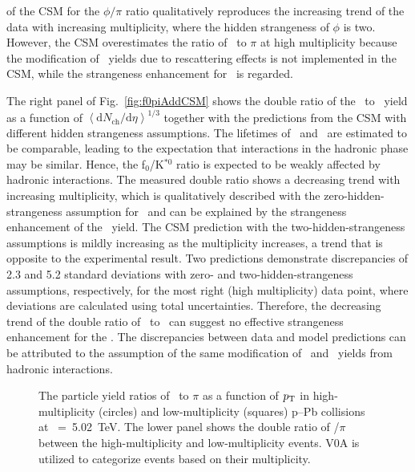 of the CSM for the $\phi/\pi$ ratio qualitatively reproduces the increasing trend of the data with increasing multiplicity, where the hidden strangeness of $\phi$ is two. However, the CSM overestimates the ratio of \kstar~to $\pi$ at high multiplicity because the modification of \kstar~yields due to rescattering effects is not implemented in the CSM, while the strangeness enhancement for \kstar~is regarded.

The right panel of Fig.~\ref{fig:f0piAddCSM} shows the double ratio of the \fzero~to \kstar~yield as a function of $\left\langle \mathrm{d}N_{\mathrm{ch}}/\mathrm{d}\eta \right\rangle^{1/3}$ together with the predictions from the CSM with different hidden strangeness assumptions. The lifetimes of \fzero~and \kstar~are estimated to be comparable, leading to the expectation that interactions in the hadronic phase may be similar. Hence, the f$_{0}$/K$^{*0}$ ratio is expected to be weakly affected by hadronic interactions. The measured double ratio shows a decreasing trend with increasing multiplicity, which is qualitatively described with the zero-hidden-strangeness assumption for \fzero~and can be explained by the strangeness enhancement of the \kstar~yield. The CSM prediction with the two-hidden-strangeness assumptions is mildly increasing as the multiplicity increases, a trend that is opposite to the experimental result. Two predictions demonstrate discrepancies of 2.3 and 5.2 standard deviations with zero- and two-hidden-strangeness assumptions, respectively, for the most right (high multiplicity) data point, where deviations are calculated using total uncertainties. Therefore, the decreasing trend of the double ratio of \fzero~to \kstar~can suggest no effective strangeness enhancement for the \fzero. The discrepancies between data and model predictions can be attributed to the assumption of the same modification of \fzero~and \kstar~yields from hadronic interactions.  

\begin{figure}[!hbt]
	\centering
	\caption{ The particle yield ratios of \fzero~to $\pi$ as a function of $p_{\rm{T}}$ in high-multiplicity (circles) and low-multiplicity (squares) p--Pb collisions at \snn~=~5.02~TeV. The lower panel shows the double ratio of \fzero/$\pi$ between the high-multiplicity and low-multiplicity events. V0A is utilized to categorize events based on their multiplicity.}
	\label{fig:f0piPt}
\end{figure}


